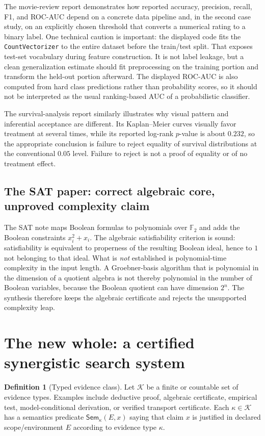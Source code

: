 \documentclass[11pt]{article}
\theoremstyle{special}
\theoremstyle{definition}
\newtheorem{definition}{Definition}[section]
\newcommand{\Sem}{\mathsf{Sem}}
\newcommand{\Ftwo}{\mathbb F_2}
\begin{document}
The movie-review report demonstrates how reported accuracy, precision, recall, F1, and ROC-AUC depend on a concrete data pipeline and, in the second case study, on an explicitly chosen threshold that converts a numerical rating to a binary label. One technical caution is important: the displayed code fits the \texttt{CountVectorizer} to the entire dataset before the train/test split. That exposes test-set vocabulary during feature construction. It is not label leakage, but a clean generalization estimate should fit preprocessing on the training portion and transform the held-out portion afterward. The displayed ROC-AUC is also computed from hard class predictions rather than probability scores, so it should not be interpreted as the usual ranking-based AUC of a probabilistic classifier.

The survival-analysis report similarly illustrates why visual pattern and inferential acceptance are different. Its Kaplan--Meier curves visually favor treatment at several times, while its reported log-rank $p$-value is about $0.232$, so the appropriate conclusion is failure to reject equality of survival distributions at the conventional $0.05$ level. Failure to reject is not a proof of equality or of no treatment effect.

\subsection{The SAT paper: correct algebraic core, unproved complexity claim}

The SAT note maps Boolean formulas to polynomials over $\Ftwo$ and adds the Boolean constraints $x_i^2+x_i$. The algebraic satisfiability criterion is sound: satisfiability is equivalent to properness of the resulting Boolean ideal, hence to $1$ not belonging to that ideal. What is \emph{not} established is polynomial-time complexity in the input length. A Groebner-basis algorithm that is polynomial in the dimension of a quotient algebra is not thereby polynomial in the number of Boolean variables, because the Boolean quotient can have dimension $2^n$. The synthesis therefore keeps the algebraic certificate and rejects the unsupported complexity leap.

\section{The new whole: a certified synergistic search system}

\begin{definition}[Typed evidence class]
Let $\mathcal K$ be a finite or countable set of evidence types. Examples include deductive proof, algebraic certificate, empirical test, model-conditional derivation, or verified transport certificate. Each $\kappa\in\mathcal K$ has a semantics predicate $\Sem_\kappa(E,x)$ saying that claim $x$ is justified in declared scope/environment $E$ according to evidence type $\kappa$.
\end{definition}
\end{document}
